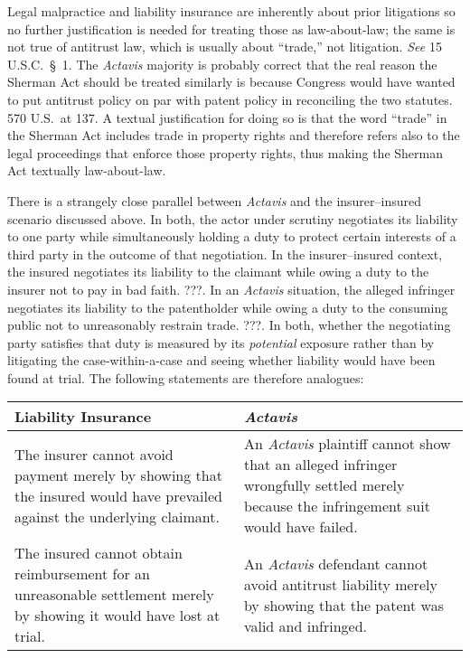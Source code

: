 \documentclass[
  12pt,
  letterpaper,
]{scrartcl}
\begin{document}
Legal malpractice and liability insurance are inherently about prior
litigations so no further justification is needed for treating those as
law-about-law; the same is not true of antitrust law, which is usually about
``trade,'' not litigation. \textit{See} 15 U.S.C.~§~1. The \textit{Actavis}
majority is probably correct that the real reason the Sherman Act should be
treated similarly is because Congress would have wanted to put antitrust policy
on par with patent policy in reconciling the two statutes. 570 U.S.~at 137. A textual
justification for doing so is that the word ``trade'' in the Sherman Act
includes trade in property rights and therefore refers also to the legal
proceedings that enforce those property rights, thus making the Sherman Act
textually law-about-law.

There is a strangely close parallel between \textit{Actavis} and the
insurer--insured scenario discussed above. In both, the actor under scrutiny
negotiates its liability to one party while simultaneously holding a duty to
protect certain interests of a third party in the outcome of that negotiation.
In the insurer--insured context, the insured negotiates its liability to the
claimant while owing a duty to the insurer not to pay in bad faith. ???. In an
\emph{Actavis} situation, the alleged infringer negotiates its liability to the
patentholder while owing a duty to the consuming public not to unreasonably
restrain trade. ???. In both, whether the negotiating party satisfies that duty
is measured by its \emph{potential} exposure rather than by litigating the
case-within-a-case and seeing whether liability would have been found at trial.
The following statements are therefore analogues:

\vspace{18pt}%
{%
  \setlength\extrarowheight{3pt}%
  \noindent\begin{tabular}{p{3in}|p{3in}}
  \textbf{Liability Insurance} & \textbf{\textit{Actavis}} \\[3pt] \hline
  {The insurer cannot avoid payment merely by showing that the insured
  would have prevailed against the underlying claimant.} &
  {An \textit{Actavis} plaintiff cannot show that an alleged infringer wrongfully
  settled merely because the infringement suit would have failed.} \\[3pt] \hline
  {The insured cannot obtain reimbursement for an unreasonable settlement merely by showing
  it would have lost at trial.} &
  {An \textit{Actavis} defendant cannot avoid
  antitrust liability merely by showing that the patent was valid and infringed.}
\end{tabular}}\vspace{18pt}
\end{document}
